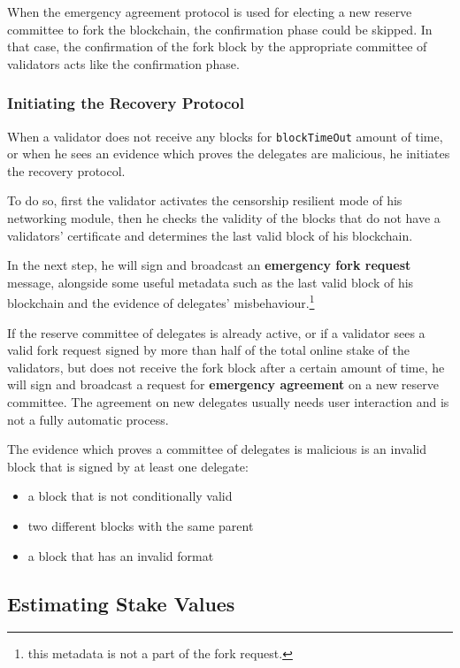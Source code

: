 When the emergency agreement protocol is used for electing a new reserve committee to fork the blockchain, the
confirmation phase could be skipped. In that case, the confirmation of the fork block by the appropriate committee
of validators acts like the confirmation phase.

\subsubsection{Initiating the Recovery Protocol}

When a validator does not receive any blocks for \texttt{blockTimeOut} amount of time, or when he sees an
evidence which proves the delegates are malicious, he initiates the recovery protocol.

To do so, first the validator activates the censorship resilient mode of his networking module, then he checks the
validity of the blocks that do not have a validators' certificate and determines the
last valid block of his blockchain.

In the next step, he will sign and broadcast an \textbf{emergency fork request} message, alongside some useful metadata
such as the last valid block of his blockchain and the evidence of delegates' misbehaviour.\footnote{this metadata is
not a part of the fork request.}

If the reserve committee of delegates is already active, or if a validator sees a valid fork request signed
by more than half of the total online stake of the validators, but does not receive the fork
block after a certain amount of time, he will sign and broadcast a request for
\textbf{emergency agreement} on a new reserve committee. The agreement on new delegates usually needs user
interaction and is not a fully automatic process.

The evidence which proves a committee of delegates is malicious is an invalid block that is signed by at least
one delegate:
\begin{itemize}
    \item a block that is not conditionally valid
    \item two different blocks with the same parent
    \item a block that has an invalid format
\end{itemize}

\subsection{Estimating Stake Values}\label{subsec:user's-stake}

